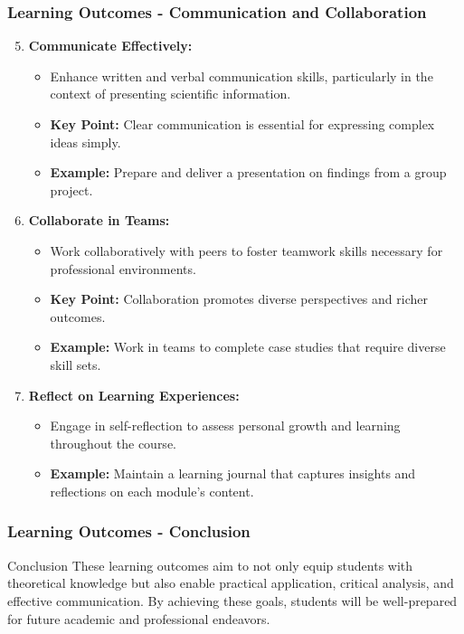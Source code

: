 \documentclass[aspectratio=169]{beamer}
\begin{document}
\begin{frame}[fragile]
    \frametitle{Learning Outcomes - Communication and Collaboration}
    \begin{enumerate}
        \setcounter{enumi}{4} %
        \item \textbf{Communicate Effectively:}
        \begin{itemize}
            \item Enhance written and verbal communication skills, particularly in the context of presenting scientific information.
            \item \textbf{Key Point:} Clear communication is essential for expressing complex ideas simply.
            \item \textbf{Example:} Prepare and deliver a presentation on findings from a group project.
        \end{itemize}

        \item \textbf{Collaborate in Teams:}
        \begin{itemize}
            \item Work collaboratively with peers to foster teamwork skills necessary for professional environments.
            \item \textbf{Key Point:} Collaboration promotes diverse perspectives and richer outcomes.
            \item \textbf{Example:} Work in teams to complete case studies that require diverse skill sets.
        \end{itemize}

        \item \textbf{Reflect on Learning Experiences:}
        \begin{itemize}
            \item Engage in self-reflection to assess personal growth and learning throughout the course.
            \item \textbf{Example:} Maintain a learning journal that captures insights and reflections on each module's content.
        \end{itemize}
    \end{enumerate}
\end{frame}

\begin{frame}[fragile]
    \frametitle{Learning Outcomes - Conclusion}
    \begin{block}{Conclusion}
        These learning outcomes aim to not only equip students with theoretical knowledge but also enable practical application, critical analysis, and effective communication. By achieving these goals, students will be well-prepared for future academic and professional endeavors.
    \end{block}
\end{frame}
\end{document}
